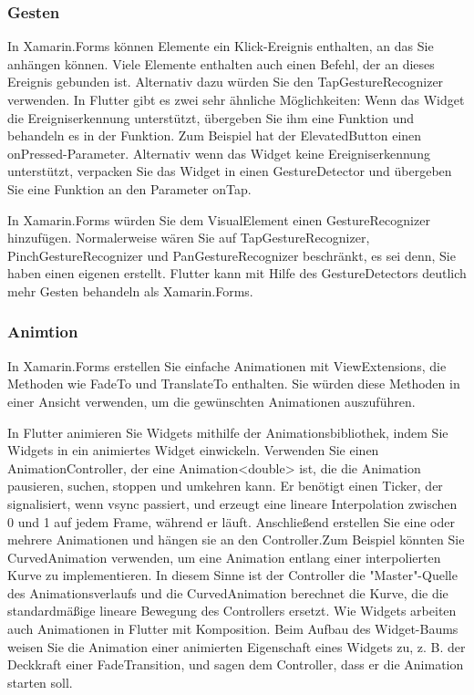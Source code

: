 \subsubsection{Gesten}
In Xamarin.Forms können Elemente ein Klick-Ereignis enthalten, an das Sie anhängen können. Viele Elemente enthalten auch einen Befehl, der an dieses Ereignis gebunden ist. Alternativ dazu würden Sie den TapGestureRecognizer verwenden. In Flutter gibt es zwei sehr ähnliche Möglichkeiten: Wenn das Widget die Ereigniserkennung unterstützt, übergeben Sie ihm eine Funktion und behandeln es in der Funktion. Zum Beispiel hat der ElevatedButton einen onPressed-Parameter. Alternativ wenn das Widget keine Ereigniserkennung unterstützt, verpacken Sie das Widget in einen GestureDetector und übergeben Sie eine Funktion an den Parameter onTap.

In Xamarin.Forms würden Sie dem VisualElement einen GestureRecognizer hinzufügen. Normalerweise wären Sie auf TapGestureRecognizer, PinchGestureRecognizer und PanGestureRecognizer beschränkt, es sei denn, Sie haben einen eigenen erstellt. Flutter kann mit Hilfe des GestureDetectors deutlich mehr Gesten behandeln als Xamarin.Forms.

\subsubsection{Animtion}
In Xamarin.Forms erstellen Sie einfache Animationen mit ViewExtensions, die Methoden wie FadeTo und TranslateTo enthalten. Sie würden diese Methoden in einer Ansicht verwenden, um die gewünschten Animationen auszuführen.

In Flutter animieren Sie Widgets mithilfe der Animationsbibliothek, indem Sie Widgets in ein animiertes Widget einwickeln. Verwenden Sie einen AnimationController, der eine Animation<double> ist, die die Animation pausieren, suchen, stoppen und umkehren kann. Er benötigt einen Ticker, der signalisiert, wenn vsync passiert, und erzeugt eine lineare Interpolation zwischen 0 und 1 auf jedem Frame, während er läuft. Anschließend erstellen Sie eine oder mehrere Animationen und hängen sie an den Controller.Zum Beispiel könnten Sie CurvedAnimation verwenden, um eine Animation entlang einer interpolierten Kurve zu implementieren. In diesem Sinne ist der Controller die "Master"-Quelle des Animationsverlaufs und die CurvedAnimation berechnet die Kurve, die die standardmäßige lineare Bewegung des Controllers ersetzt. Wie Widgets arbeiten auch Animationen in Flutter mit Komposition.
Beim Aufbau des Widget-Baums weisen Sie die Animation einer animierten Eigenschaft eines Widgets zu, z. B. der Deckkraft einer FadeTransition, und sagen dem Controller, dass er die Animation starten soll.

